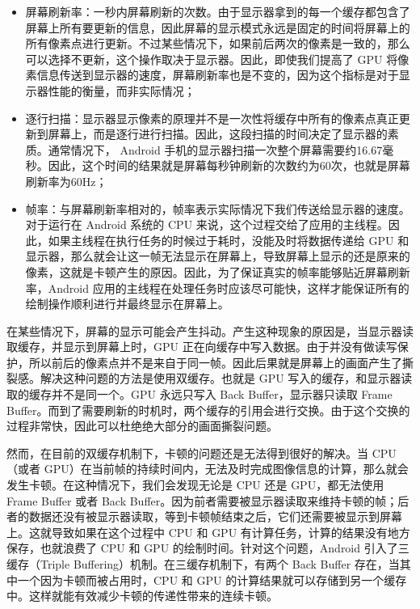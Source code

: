 \begin{itemize}
    \item 屏幕刷新率：一秒内屏幕刷新的次数。由于显示器拿到的每一个缓存都包含了屏幕上所有要更新的信息，因此屏幕的显示模式永远是固定的时间将屏幕上的所有像素点进行更新。不过某些情况下，如果前后两次的像素是一致的，那么可以选择不更新，这个操作取决于显示器。因此，即使我们提高了 GPU 将像素信息传送到显示器的速度，屏幕刷新率也是不变的，因为这个指标是对于显示器性能的衡量，而非实际情况；
    \item 逐行扫描：显示器显示像素的原理并不是一次性将缓存中所有的像素点真正更新到屏幕上，而是逐行进行扫描\cite{张春明2002显示器刷新率的测试以及逐行显示器的辨别方法}。因此，这段扫描的时间决定了显示器的素质。通常情况下， Android 手机的显示器扫描一次整个屏幕需要约16.67毫秒。因此，这个时间的结果就是屏幕每秒钟刷新的次数约为60次，也就是屏幕刷新率为60Hz；
    \item 帧率：与屏幕刷新率相对的，帧率表示实际情况下我们传送给显示器的速度。对于运行在 Android 系统的 CPU 来说，这个过程交给了应用的主线程。因此，如果主线程在执行任务的时候过于耗时，没能及时将数据传递给 GPU 和显示器，那么就会让这一帧无法显示在屏幕上，导致屏幕上显示的还是原来的像素，这就是卡顿产生的原因。因此，为了保证真实的帧率能够贴近屏幕刷新率，Android 应用的主线程在处理任务时应该尽可能快，这样才能保证所有的绘制操作顺利进行并最终显示在屏幕上。
\end{itemize}

在某些情况下，屏幕的显示可能会产生抖动。产生这种现象的原因是，当显示器读取缓存，并显示到屏幕上时，GPU 正在向缓存中写入数据。由于并没有做读写保护，所以前后的像素点并不是来自于同一帧。因此后果就是屏幕上的画面产生了撕裂感。解决这种问题的方法是使用双缓存。也就是 GPU 写入的缓存，和显示器读取的缓存并不是同一个。GPU 永远只写入 Back Buffer，显示器只读取 Frame Buffer。而到了需要刷新的时机时，两个缓存的引用会进行交换。由于这个交换的过程非常快，因此可以杜绝绝大部分的画面撕裂问题。

然而，在目前的双缓存机制下，卡顿的问题还是无法得到很好的解决。当 CPU（或者 GPU）在当前帧的持续时间内，无法及时完成图像信息的计算，那么就会发生卡顿。在这种情况下，我们会发现无论是 CPU 还是 GPU，都无法使用 Frame Buffer 或者 Back Buffer。因为前者需要被显示器读取来维持卡顿的帧；后者的数据还没有被显示器读取，等到卡顿帧结束之后，它们还需要被显示到屏幕上。这就导致如果在这个过程中 CPU 和 GPU 有计算任务，计算的结果没有地方保存，也就浪费了 CPU 和 GPU 的绘制时间。针对这个问题，Android 引入了三缓存（Triple Buffering）机制\cite{egilmez2017user}。在三缓存机制下，有两个 Back Buffer 存在，当其中一个因为卡顿而被占用时，CPU 和 GPU 的计算结果就可以存储到另一个缓存中。这样就能有效减少卡顿的传递性带来的连续卡顿。

